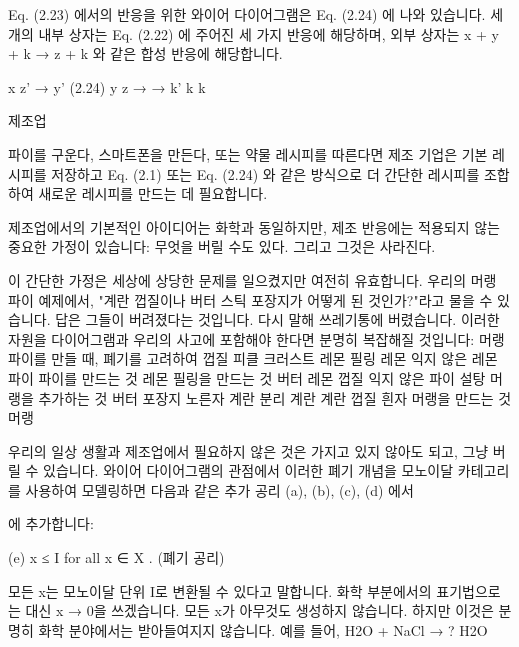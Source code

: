 \documentclass[11pt, a4paper, twoside, openany]{book}
\begin{document}
{\par\medskip
Eq. (2.23) 에서의 반응을 위한 와이어 다이어그램은 Eq. (2.24) 에 나와 있습니다. 세 개의 내부 상자는 Eq. (2.22) 에 주어진 세 가지 반응에 해당하며, 외부 상자는 x + y + k → z + k 와 같은 합성 반응에 해당합니다.

\par\medskip
x
z'
→
y'
(2.24)
y
z
→
→
k'
k
k

\par\medskip
제조업

\par\medskip
파이를 구운다, 스마트폰을 만든다, 또는 약물 레시피를 따른다면 제조 기업은 기본 레시피를 저장하고 Eq. (2.1) 또는 Eq. (2.24) 와 같은 방식으로 더 간단한 레시피를 조합하여 새로운 레시피를 만드는 데 필요합니다.

\par\medskip
제조업에서의 기본적인 아이디어는 화학과 동일하지만, 제조 반응에는 적용되지 않는 중요한 가정이 있습니다:
무엇을 버릴 수도 있다. 그리고 그것은 사라진다.

\par\medskip
이 간단한 가정은 세상에 상당한 문제를 일으켰지만 여전히 유효합니다. 우리의 머랭 파이 예제에서, "계란 껍질이나 버터 스틱 포장지가 어떻게 된 것인가?"라고 물을 수 있습니다. 답은 그들이 버려졌다는 것입니다. 다시 말해 쓰레기통에 버렸습니다. 이러한 자원을 다이어그램과 우리의 사고에 포함해야 한다면 분명히 복잡해질 것입니다:
머랭 파이를 만들 때, 폐기를 고려하여
껍질
피클 크러스트
레몬
필링
레몬
익지 않은 레몬 파이
파이를 만드는 것
레몬 필링을 만드는 것
버터
레몬 껍질
익지 않은 파이
설탕
머랭을 추가하는 것
버터 포장지
노른자
계란 분리
계란
계란 껍질
흰자
머랭을 만드는 것
머랭

\par\medskip
우리의 일상 생활과 제조업에서 필요하지 않은 것은 가지고 있지 않아도 되고, 그냥 버릴 수 있습니다. 와이어 다이어그램의 관점에서 이러한 폐기 개념을 모노이달 카테고리를 사용하여 모델링하면 다음과 같은 추가 공리 (a), (b), (c), (d) 에서 
\begin{definitionbox}[정의 2.2]
에 추가합니다:
\end{definitionbox}

\par\medskip
(e) x ≤ I for all x ∈ X .
(폐기 공리)

\par\medskip
모든 x\hspace{0pt}는 모노이달 단위 I\hspace{0pt}로 변환될 수 있다고 말합니다. 화학 부분에서의 표기법으로는 대신 x → 0\hspace{0pt}을 쓰겠습니다. 모든 x\hspace{0pt}가 아무것도 생성하지 않습니다. 하지만 이것은 분명히 화학 분야에서는 받아들여지지 않습니다. 예를 들어,
H2O + NaCl → ? H2O

}
\end{document}
